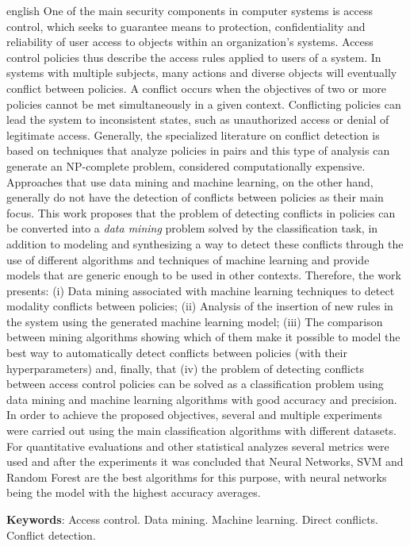 \documentclass[
	12pt,				%
	openright,			%
	oneside,			%
	a4paper,			%
	english,			%
	french,				%
	spanish,			%
	brazil				%
	]{abntex2}
\begin{document}
\begin{resumo}[Abstract]
\begin{otherlanguage*}{english}
One of the main security components in computer systems is access control, which seeks to guarantee means to protection, confidentiality and reliability of user access to objects within an organization's systems. Access control policies thus describe the access rules applied to users of a system. In systems with multiple subjects, many actions and diverse objects will eventually conflict between policies. A conflict occurs when the objectives of two or more policies cannot be met simultaneously in a given context. Conflicting policies can lead the system to inconsistent states, such as unauthorized access or denial of legitimate access. Generally, the specialized literature on conflict detection is based on techniques that analyze policies in pairs and this type of analysis can generate an NP-complete problem, considered computationally expensive. Approaches that use data mining and machine learning, on the other hand, generally do not have the detection of conflicts between policies as their main focus. This work proposes that the problem of detecting conflicts in policies can be converted into a \textit{data mining} problem solved by the classification task, in addition to modeling and synthesizing a way to detect these conflicts through the use of different algorithms and techniques of machine learning and provide models that are generic enough to be used in other contexts. Therefore, the work presents: (i) Data mining associated with machine learning techniques to detect modality conflicts between policies; (ii) Analysis of the insertion of new rules in the system using the generated machine learning model; (iii) The comparison between mining algorithms showing which of them make it possible to model the best way to automatically detect conflicts between policies (with their hyperparameters) and, finally, that (iv) the problem of detecting conflicts between access control policies can be solved as a classification problem using data mining and machine learning algorithms with good accuracy and precision. In order to achieve the proposed objectives, several and multiple experiments were carried out using the main classification algorithms with different datasets. For quantitative evaluations and other statistical analyzes several metrics were used and after the experiments it was concluded that Neural Networks, SVM and Random Forest are the best algorithms for this purpose, with neural networks being the model with the highest accuracy averages.
   \vspace{\onelineskip}
 
   \noindent 
   \textbf{Keywords}: Access control. Data mining. Machine learning. Direct conflicts. Conflict detection.
 \end{otherlanguage*}
\end{resumo}
\end{document}
